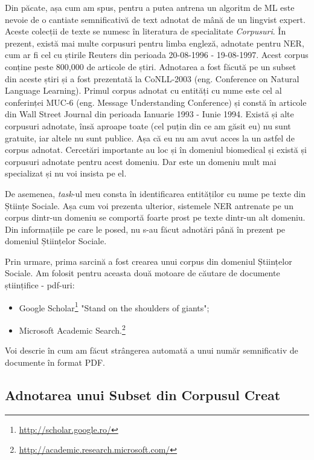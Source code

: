Din păcate, așa cum am spus, pentru a putea antrena un algoritm de ML este nevoie de o cantiate semnificativă de text adnotat de mână de un lingvist expert. Aceste colecții de texte se numesc în literatura de specialitate \textit{Corpusuri}. În prezent, există mai multe corpusuri pentru limba engleză, adnotate pentru NER, cum ar fi cel cu știrile Reuters din perioada 20-08-1996 - 19-08-1997.\cite{rcv1} Acest corpus conține peste 800,000 de articole de știri. Adnotarea a fost făcută pe un subset din aceste știri și a fost prezentată la CoNLL-2003\cite{conll2003} (eng. Conference on Natural Language Learning). Primul corpus adnotat cu entități cu nume este cel al conferinței MUC-6 (eng. Message Understanding Conference) și constă în articole din Wall Street Journal din perioada Ianuarie 1993 - Iunie 1994.  Există și alte corpusuri adnotate, însă aproape toate (cel puțin din ce am găsit eu) nu sunt gratuite, iar altele nu sunt publice. Așa că eu nu am avut acces la un astfel de corpus adnotat. Cercetări importante au loc și în domeniul biomedical și există și corpusuri adnotate pentru acest domeniu. Dar este un domeniu mult mai specializat și nu voi insista pe el.

De asemenea, \textit{task}-ul meu consta în identificarea entităților cu nume pe texte din Științe Sociale. Așa cum voi prezenta ulterior, sistemele NER antrenate pe un corpus dintr-un domeniu se comportă foarte prost pe texte dintr-un alt domeniu. Din informațiile pe care le posed, nu s-au făcut adnotări până în prezent pe domeniul Științelor Sociale.

Prin urmare, prima sarcină a fost crearea unui corpus din domeniul Științelor Sociale. Am folosit pentru aceasta două motoare de căutare de documente științifice - pdf-uri:

\begin{itemize}
\item Google Scholar\footnote{\url{http://scholar.google.ro/}} "Stand on the shoulders of giants";
\item Microsoft Academic Search.\footnote{\url{http://academic.research.microsoft.com/}}
\end{itemize}

Voi descrie în  cum am făcut strângerea automată a unui număr semnificativ de documente în format PDF.

\subsection{Adnotarea unui Subset din Corpusul Creat}

